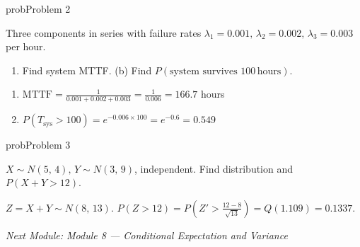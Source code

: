 \begin{PSbox}[unbreakable]{prob}{Problem 2}

Three components in series with failure rates $\lambda_{1} = 0.001,\, \lambda_{2} = 0.002,\, \lambda_{3} = 0.003$ per hour.

\begin{enumerate}
\def\labelenumi{(\alph{enumi})}
\tightlist
\item
  Find system MTTF. (b) Find $P(\text{system survives 100}\,\mathrm{hours})$.
\end{enumerate}

\PSsolution{} 

\begin{enumerate}
\def\labelenumi{(\alph{enumi})}
\tightlist
\item
  $\mathrm{MTTF} = \frac{1}{0.001+0.002+0.003} = \frac{1}{0.006} = 166.7$ hours
\item
  $P(T_{\text{sys}} > 100) = e^{-0.006 \times 100} = e^{-0.6} = 0.549$
\end{enumerate}

\end{PSbox}

\begin{PSbox}[unbreakable]{prob}{Problem 3}

$X \sim N(5,\, 4),\, Y \sim N(3,\, 9)$, independent. Find distribution and $P(X + Y > 12)$.

\PSsolution{} $Z = X+Y \sim N(8,\, 13)$. $P(Z > 12) = P\left(Z' > \frac{12-8}{\sqrt{13}}\right) = Q(1.109) = 0.1337$.

\emph{Next Module: {Module 8 — Conditional Expectation and Variance}}

\end{PSbox}
